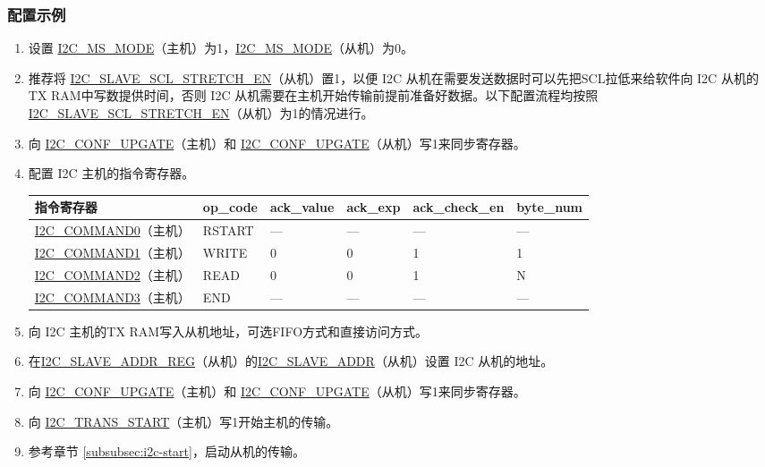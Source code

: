 \documentclass[main\_\_CN.tex]{subfiles}
\begin{document}
\subsubsection{配置示例}
\begin{enumerate}
\item 设置 \hyperref[fielddesc:I2CMSMODE]{I2C\_MS\_MODE}（主机）为1，\hyperref[fielddesc:I2CMSMODE]{I2C\_MS\_MODE}（从机）为0。
\item 推荐将 \hyperref[fielddesc:I2CSLAVESCLSTRETCHEN]{I2C\_SLAVE\_SCL\_STRETCH\_EN}（从机）置1，以便 I2C 从机在需要发送数据时可以先把SCL拉低来给软件向 I2C 从机的TX RAM中写数提供时间，否则 I2C 从机需要在主机开始传输前提前准备好数据。以下配置流程均按照\hyperref[fielddesc:I2CSLAVESCLSTRETCHEN]{I2C\_SLAVE\_SCL\_STRETCH\_EN}（从机）为1的情况进行。
\item 向 \hyperref[fielddesc:I2CCONFUPGATE]{I2C\_CONF\_UPGATE}（主机）和 \hyperref[fielddesc:I2CCONFUPGATE]{I2C\_CONF\_UPGATE}（从机）写1来同步寄存器。
\item 配置 I2C 主机的指令寄存器。
\begin{longtable}{ | p{4cm} | p{2cm} | p{2cm} | p{2cm} |p{2cm} | p{2cm} |}
\hline\rowcolor{lightgray}
指令寄存器& op\_code & ack\_value&ack\_exp&ack\_check\_en&byte\_num  \\ \hline
\hyperref[fielddesc:I2CCOMMAND0]{I2C\_COMMAND0}（主机）& RSTART& ---&---&---&---  \\ \hline
\hyperref[fielddesc:I2CCOMMAND1]{I2C\_COMMAND1}（主机）& WRITE& 0&0&1&1  \\ \hline
\hyperref[fielddesc:I2CCOMMAND2]{I2C\_COMMAND2}（主机）& READ& 0&0&1&N  \\ \hline
\hyperref[fielddesc:I2CCOMMAND3]{I2C\_COMMAND3}（主机）& END& ---&---&---&---  \\ \hline
\end{longtable}
\item 向 I2C 主机的TX RAM写入从机地址，可选FIFO方式和直接访问方式。
\item 在\hyperref[regdesc:I2CSLAVEADDRREG]{I2C\_SLAVE\_ADDR\_REG}（从机）的\hyperref[fielddesc:I2CSLAVEADDR]{I2C\_SLAVE\_ADDR}（从机）设置 I2C 从机的地址。
\item 向 \hyperref[fielddesc:I2CCONFUPGATE]{I2C\_CONF\_UPGATE}（主机）和 \hyperref[fielddesc:I2CCONFUPGATE]{I2C\_CONF\_UPGATE}（从机）写1来同步寄存器。
\item 向 \hyperref[fielddesc:I2CTRANSSTART]{I2C\_TRANS\_START}（主机）写1开始主机的传输。
\item 参考章节 \ref{subsubsec:i2c-start}，启动从机的传输。

\end{enumerate}
\end{document}
